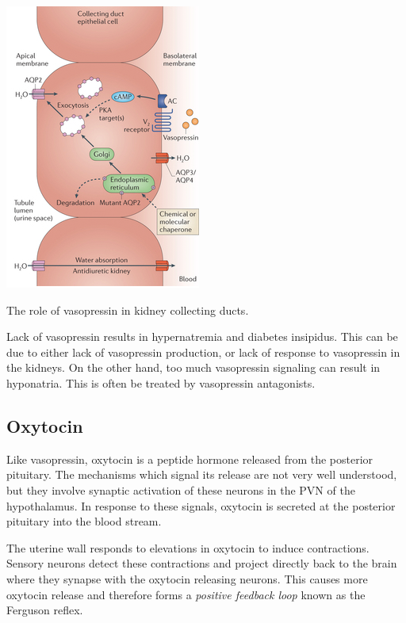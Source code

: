 \documentclass{tufte-handout}
\begin{document}
\begin{marginfigure}
  \includegraphics{figures/vasopressin}
  \caption{The role of vasopressin in kidney collecting ducts.}
    \label{fig:vasopressin}
\end{marginfigure}

  Lack of vasopressin results in hypernatremia and diabetes insipidus.  This can be due to either lack of vasopressin production, or lack of response to vasopressin in the kidneys.  On the other hand, too much vasopressin signaling can result in hyponatria.  This is often be treated by vasopressin antagonists.

\subsection{Oxytocin}

Like vasopressin, oxytocin is a peptide hormone released from the posterior pituitary.  The mechanisms which signal its release are not very well understood, but they involve synaptic activation of these neurons in the PVN of the hypothalamus.  In response to these signals, oxytocin is secreted at the posterior pituitary into the blood stream.

  The uterine wall responds to elevations in oxytocin to induce contractions.  Sensory neurons detect these contractions and project directly back to the brain where they synapse with the oxytocin releasing neurons.  This causes more oxytocin release and therefore forms a \emph{positive feedback loop} known as the Ferguson reflex\cite{Ferguson1941}.
\end{document}
